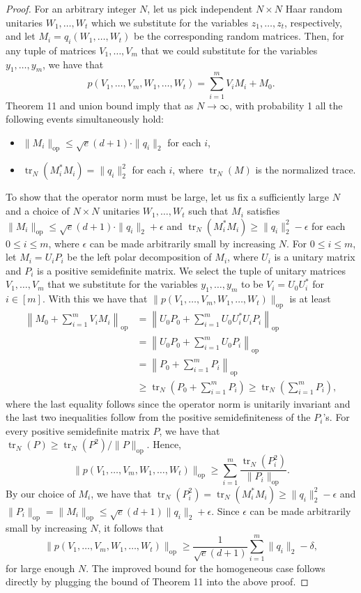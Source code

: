 \documentclass[10pt,a4paper]{article}
\begin{document}
\begin{proof}
For an arbitrary integer $N$, let us pick independent $N\times N$ Haar random unitaries $W_1,\ldots,W_t$ which we substitute for the variables $z_1,\ldots,z_t$, respectively, and let $M_i=q_i(W_1,\ldots,W_t)$ be the corresponding random matrices. Then, for any tuple of matrices $V_1,\ldots,V_m$ that we could substitute for the variables $y_1,\ldots,y_m$, we have that
\[p(V_1,\ldots,V_m,W_1,\ldots,W_t)=\sum_{i=1}^mV_iM_i+M_0.\]
Theorem 11 and union bound imply that as $N\to\infty$, with probability 1 all the following events simultaneously hold:
\begin{itemize}
\item $\|M_i\|_{\mathrm{op}}\leq\sqrt e(d+1)\cdot\|q_i\|_2$ for each $i$,
\item $\operatorname{tr}_N(M_i^*M_i)=\|q_i\|_2^2$ for each $i$, where $\operatorname{tr}_N(M)$ is the normalized trace.
\end{itemize}
To show that the operator norm must be large, let us fix a sufficiently large $N$ and a choice of $N\times N$ unitaries $W_1,\ldots,W_t$ such that $M_i$ satisfies $\|M_i\|_{\mathrm{op}}\leq\sqrt e(d+1)\cdot\|q_i\|_2+\epsilon$ and $\operatorname{tr}_N(M_i^*M_i)\geq\|q_i\|_2^2-\epsilon$ for each $0\leq i\leq m$, where $\epsilon$ can be made arbitrarily small by increasing $N$. For $0\leq i\leq m$, let $M_i=U_iP_i$ be the left polar decomposition of $M_i$, where $U_i$ is a unitary matrix and $P_i$ is a positive semidefinite matrix.
We select the tuple of unitary matrices $V_1,\ldots,V_m$ that we substitute for the variables $y_1,\ldots,y_m$ to be $V_i=U_0U_i^*$ for $i\in[m]$. With this we have that $\|p(V_1,\ldots,V_m,W_1,\ldots,W_t)\|_{\mathrm{op}}$ is at least
\begin{align*}
\left\|M_0+\sum_{i=1}^mV_iM_i\right\|_{\mathrm{op}}
&=\left\|U_0P_0+\sum_{i=1}^mU_0U_i^*U_iP_i\right\|_{\mathrm{op}}\\
&=\left\|U_0P_0+\sum_{i=1}^mU_0P_i\right\|_{\mathrm{op}}\\
&=\left\|P_0+\sum_{i=1}^mP_i\right\|_{\mathrm{op}}\\
&\geq\operatorname{tr}_N\left(P_0+\sum_{i=1}^mP_i\right)\geq\operatorname{tr}_N\left(\sum_{i=1}^mP_i\right),
\end{align*}
where the last equality follows since the operator norm is unitarily invariant and the last two inequalities follow from the positive semidefiniteness of the $P_i$'s.
For every positive semidefinite matrix $P$, we have that $\operatorname{tr}_N(P)\geq\operatorname{tr}_N(P^2)/\|P\|_{\mathrm{op}}$. Hence,
\[\|p(V_1,\ldots,V_m,W_1,\ldots,W_t)\|_{\mathrm{op}}\geq\sum_{i=1}^m\frac{\operatorname{tr}_N(P_i^2)}{\|P_i\|_{\mathrm{op}}}.\]
By our choice of $M_i$, we have that $\operatorname{tr}_N(P_i^2)=\operatorname{tr}_N(M_i^*M_i)\geq\|q_i\|_2^2-\epsilon$ and $\|P_i\|_{\mathrm{op}}=\|M_i\|_{\mathrm{op}}\leq\sqrt e(d+1)\|q_i\|_2+\epsilon$. Since $\epsilon$ can be made arbitrarily small by increasing $N$, it follows that
\[\|p(V_1,\ldots,V_m,W_1,\ldots,W_t)\|_{\mathrm{op}}\geq\frac1{\sqrt e(d+1)}\sum_{i=1}^m\|q_i\|_2-\delta,\]
for large enough $N$. The improved bound for the homogeneous case follows directly by plugging the bound of Theorem 11 into the above proof.
\end{proof}
\end{document}

